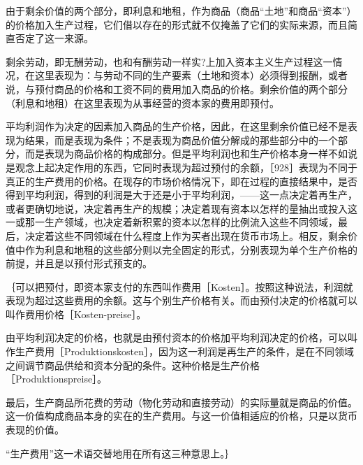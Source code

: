 由于剩余价值的两个部分，即利息和地租，作为商品（商品“土地”和商品“资本”）的价格加入生产过程，它们借以存在的形式就不仅掩盖了它们的实际来源，而且简直否定了这一来源。

剩余劳动，即无酬劳动，也和有酬劳动一样实?上加入资本主义生产过程这一情况，在这里表现为：与劳动不同的生产要素（土地和资本）必须得到报酬，或者说，与预付商品的价格和工资不同的费用加入商品的价格。剩余价值的两个部分（利息和地租）在这里表现为从事经营的资本家的费用即预付。

平均利润作为决定的因素加入商品的生产价格，因此，在这里剩余价值已经不是表现为结果，而是表现为条件；不是表现为商品价值分解成的那些部分中的一个部分，而是表现为商品价格的构成部分。但是平均利润也和生产价格本身一样不如说是观念上起决定作用的东西，它同时表现为超过预付的余额，［928］表现为不同于真正的生产费用的价格。在现存的市场价格情况下，即在过程的直接结果中，是否得到平均利润，得到的利润是大于还是小于平均利润，——这一点决定着再生产，或者更确切地说，决定着再生产的规模；决定着现有资本以怎样的量抽出或投入这一或那一生产领域，也决定着新积累的资本以怎样的比例流入这些不同领域，最后，决定着这些不同领域在什么程度上作为买者出现在货币市场上。相反，剩余价值中作为利息和地租的这些部分则以完全固定的形式，分别表现为单个生产价格的前提，并且是以预付形式预支的。


｛可以把预付，即资本家支付的东西叫作费用［Kosten］。按照这种说法，利润就表现为超过这些费用的余额。这与个别生产价格有关。而由预付决定的价格就可以叫作费用价格［Kosten-preise］。

由平均利润决定的价格，也就是由预付资本的价格加平均利润决定的价格，可以叫作生产费用［Produktionskosten］，因为这一利润是再生产的条件，是在不同领域之间调节商品供给和资本分配的条件。这种价格是生产价格［Produktionspreise］。

最后，生产商品所花费的劳动（物化劳动和直接劳动）的实际量就是商品的价值。这一价值构成商品本身的实在的生产费用。与这一价值相适应的价格，只是以货币表现的价值。

“生产费用”这一术语交替地用在所有这三种意思上。｝


